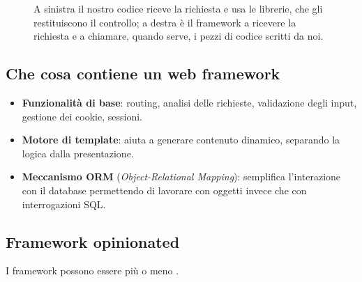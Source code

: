 \begin{figure}[H]
  \caption{A sinistra il nostro codice riceve la richiesta e usa le librerie,
           che gli restituiscono il controllo; a destra è il framework a
           ricevere la richiesta e a chiamare, quando serve, i pezzi di codice
           scritti da noi.}
  \label{fig:ioc}
\end{figure}

\subsection{Che cosa contiene un web framework}

\begin{itemize}
  \item \textbf{Funzionalità di base}: routing, analisi delle richieste,
        validazione degli input, gestione dei cookie, sessioni.
  \item \textbf{Motore di template}: aiuta a generare contenuto dinamico,
        separando la logica dalla presentazione.
  \item \textbf{Meccanismo ORM} (\textit{Object-Relational Mapping}):
        semplifica l'interazione con il database permettendo di lavorare con
        oggetti invece che con interrogazioni SQL.
\end{itemize}

\subsection{Framework opinionated}

I framework possono essere più o meno .

